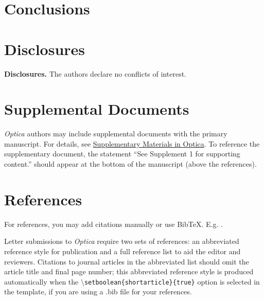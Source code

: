 \documentclass[9pt,twocolumn,twoside,pdftex]{optica}
\begin{document}
\section{Conclusions}






\section*{Disclosures}

\medskip

\noindent\textbf{Disclosures.} The authors declare no conflicts of interest.

\section*{Supplemental Documents}
\emph{Optica} authors may include supplemental documents with the primary manuscript. For details, see \href{http://www.opticsinfobase.org/submit/style/supplementary-materials-optica.cfm}{Supplementary Materials in Optica}. To reference the supplementary document, the statement ``See Supplement 1 for supporting content.'' should appear at the bottom of the manuscript (above the references).


\section*{References}

For references, you may add citations manually or use BibTeX. E.g. \cite{Zhang:14}.

Letter submissions to \emph{Optica} require two sets of references: an abbreviated reference style for publication and a full reference list to aid the editor and reviewers. Citations to journal articles in the abbreviated list should omit the article title and final page number; this abbreviated reference style is produced automatically when the \texttt{$\setminus$setboolean\{shortarticle\}\{true\}} option is selected in the template, if you are using a .bib file for your references.
 
\end{document}
